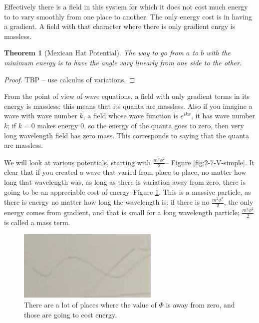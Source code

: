 \documentclass[]{article}
\newtheorem{thm}{Theorem}
\begin{document}
Effectively there is a field in this system  for which it does not cost much energy to to vary smoothly from one place to another. The only energy cost is in having a gradient. A field with that character where there is only gradient enrgy is massless.

\begin{thm}[Mexican Hat Potential]
	The way to go from $a$ to $b$ with the minimum energy is to have the angle vary linearly from one side to the other.
\end{thm}
\begin{proof}
	TBP -- use calculus of variations.
\end{proof}

 From the point of view of wave equations, a field with only gradient terms in its energy is massless: this means that its quanta are massless. Also if you imagine a wave with wave number $k$, a field whose wave function is $e^{ikx}$, it has wave number $k$; if $k=0$ makes energy $0$, so the energy of the quanta goes to zero, then very long wavelength field has zero mass. This corresponds to saying that the quanta are massless.
 
We will look at various potentials, starting with $\frac{m^2 \phi^2}{2}$--  Figure \ref{fig:2-7-V-simple}. It clear that if you created a wave that varied from place to place, no matter how long that wavelength was, as long as there is  variation away from zero, there is going to be an appreciable cost of energy--Figure \ref{fig:2-7-variation-from-zero}. This is a massive particle, as there is energy no matter how long the wavelength is: if there is no $\frac{m^2 \phi^2}{2}$, the only energy comes from gradient, and that is small for a long wavelength particle; $\frac{m^2 \phi^2}{2}$ is called a mass term.

\begin{figure}[H]
	\begin{center}
		\caption[There are a lot of places where the value of $\Phi$ is away from zero]{There are a lot of places where the value of $\Phi$ is away from zero, and those are going to cost energy.}\label{fig:2-7-variation-from-zero}
		\includegraphics[width=0.6\textwidth]{2-7-variation-from-zero}
	\end{center}
\end{figure}
\end{document}
